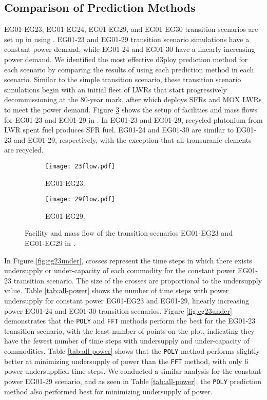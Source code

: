 \subsection{Comparison of Prediction Methods}

EG01-EG23, EG01-EG24, EG01-EG29, and EG01-EG30 transition scenarios
are set up in \Cyclus using \deploy. 
EG01-23 and EG01-29 transition scenario simulations have a constant 
power demand, while EG01-24 and EG01-30 have a linearly increasing
power demand. 
We identified the most effective d3ploy prediction method 
for each scenario by comparing the results of using each 
prediction method in each scenario. 
Similar to the simple transition scenario, these transition scenario 
simulations begin with an initial fleet of \glspl{LWR} 
that start progressively decommissioning at the 80-year mark, 
after which \deploy deploys \glspl{SFR} and \gls{MOX} \glspl{LWR} to meet 
the power demand. 
Figure \ref{fig:eg2329}
shows the setup of facilities and mass flows for 
EG01-23 and EG01-29 in \Cyclus. 
In EG01-23 and EG01-29, recycled plutonium from LWR spent fuel 
produces  \gls{SFR} fuel. 
EG01-24 and EG01-30 are similar to EG01-23 and EG01-29, respectively, 
with the exception that all transuranic elements are recycled.

\begin{figure}[]
	\centering
	\begin{subfigure}[t]{\textwidth}
		\centering
		\texttt{[image: 23flow.pdf]} 
		\caption{EG01-EG23.}
		\label{fig:23flow}
	\end{subfigure}
	\vspace{1cm}
	\begin{subfigure}[t]{\textwidth}
		\centering
		\texttt{[image: 29flow.pdf]} 
		\caption{EG01-EG29.}
		\label{fig:29flow}
	\end{subfigure}
	\hfill
	\caption{Facility and mass flow of the transition scenarios EG01-EG23 and EG01-EG29 in \Cyclus.}
	\label{fig:eg2329}
\end{figure}

In Figure \ref{fig:eg23under}, crosses represent the time steps in which there exists
undersupply or under-capacity of each commodity for the constant power 
EG01-23 transition scenario.
The size of the crosses are proportional to the undersupply value. 
Table \ref{tab:all-power} shows the number of time steps with power 
undersupply for constant power EG01-EG23 and EG01-29, 
linearly increasing power EG01-24 and EG01-30 transition scenarios. 
Figure \ref{fig:eg23under} demonstrates that the \texttt{POLY} and 
\texttt{FFT} methods perform the best for the EG01-23 transition scenario,
with the least number of points on the plot, 
indicating they have the fewest number of time 
steps with undersupply and under-capacity of commodities. 
Table \ref{tab:all-power} shows that the \texttt{POLY} method performs slightly 
better at minimizing undersupply of power than the \texttt{FFT} method, 
with only 6 power undersupplied time steps.
We conducted a similar analysis for the constant power EG01-29 scenario,
and as seen in Table \ref{tab:all-power}, the \texttt{POLY} prediction method 
also performed best for minimizing undersupply of power.  

